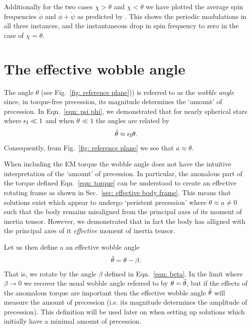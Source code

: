 \documentclass[../full_thesis/full_thesis.tex]{subfiles}
\begin{document}
Additionally for the two cases $\chi>\theta$ and $\chi < \theta$ we have
plotted the average spin frequencies $\dot{\phi}$ and $\dot{\phi}+\dot{\psi}$
as predicted by \citet{Jones2001}. This shows the periodic modulations in all
three instances, and the instantaneous drop in spin frequency to zero in the
case of $\chi=\theta$.

\section{The effective wobble angle}
\label{sec: wobble angle}
The angle $\theta$ (see Fig.~\ref{fig: reference plane})) is referred to as the
\emph{wobble angle} since, in torque-free precession, its magnitude determines
the `amount' of precession.  In Eqn.~\eqref{eqn: psi phi}, we demonstrated that
for nearly spherical stars where $\epsilon_{\mathrm{I}} \ll 1$ and when $\theta \ll 1$ the
angles are related by
\begin{align}
\hat{\theta} \approx \epsilon_{\mathrm{I}}\theta.
\label{eqn: theta hat theta}
\end{align}
Consequently, from Fig.~\ref{fig: reference plane} we see that $a\approx
\theta$.

When including the EM torque the wobble angle
does not have the intuitive interpretation of the `amount' of precession.  In
particular, the anonalous part of the torque defined Eqn.~\eqref{eqn: torque}
can be understood to create an effective rotating frame as shown in Sec.~\ref{sec:
effective body frame}. This means that solutions exist which appear to undergo
`peristent precession' where $\theta \approx a\ne0$ such that the body remains
misaligned from the principal axes of its moment of inertia tensor. However, we
demonstrated that in fact the body has alligned with the principal axes of
it \emph{effective} moment of inertia tensor.

Let us then define a an effective wobble angle
\begin{align}
\tilde{\theta} = \theta - \beta.
\label{eqn: wobble angle}
\end{align}
That is, we rotate by the angle $\beta$ defined in Eqn.~\eqref{eqn: beta}. In
the limit where $\beta \rightarrow 0$ we recover the usual wobble angle referred
to by \citet{Jones2001} $\theta = \tilde{\theta}$, but if the effects of the
anomalous torque are important then the effective wobble angle $\tilde{\theta}$ will
measure the amount of precession (i.e. its magnitude determines the amplitude
of precession). This definition will be used later on when setting up solutions
which initially have a minimal amount of precession.
\end{document}
